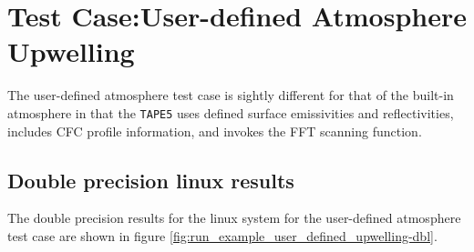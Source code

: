 \section{Test Case:User-defined Atmosphere Upwelling}

The user-defined atmosphere test case is sightly different for that of the built-in atmosphere in that the \texttt{TAPE5} uses defined surface emissivities and reflectivities, includes CFC profile information, and invokes the FFT scanning function.

\subsection{Double precision linux results}
The double precision results for the linux system for the user-defined atmosphere test case are shown in figure \ref{fig:run_example_user_defined_upwelling-dbl}.

